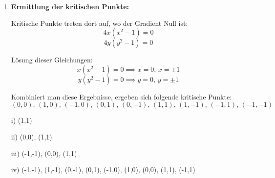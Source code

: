 {\begin{itemize}
\begin{enumerate}
\item \textbf{Ermittlung der kritischen Punkte:}

Kritische Punkte treten dort auf, wo der Gradient Null ist:
\[
4x(x^2 - 1) = 0
\]
\[
4y(y^2 - 1) = 0
\]

Lösung dieser Gleichungen:
\[
x(x^2 - 1) = 0 \implies x = 0, \, x = \pm 1
\]
\[
y(y^2 - 1) = 0 \implies y = 0, \, y = \pm 1
\]

Kombiniert man diese Ergebnisse, ergeben sich folgende kritische Punkte:
\[
(0, 0), \, (1, 0), \, (-1, 0), \, (0, 1), \, (0, -1), \, (1, 1), \, (1, -1), \, (-1, 1), \, (-1, -1)
\]

%
%
%
%
%
%
%
\end{enumerate}
\end{itemize}
}

{
\begin{itemize}
\item[i)] (1,1)
\item[ii)] (0,0), (1,1)
\item[iii)] (-1,-1), (0,0), (1,1)
\item[iv)]  (-1,-1), (1,-1), (0,-1), (0,1), (-1,0), (1,0), (0,0), (1,1), (-1,1)
\end{itemize}
}
